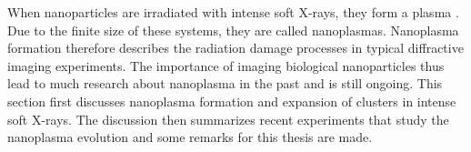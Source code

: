 %
When nanoparticles are irradiated with intense soft X-rays, they form a plasma \cite{Ditmire-1996-PRA}. Due to the finite size of these systems, they are called nanoplasmas. Nanoplasma formation therefore describes the radiation damage processes in typical diffractive imaging experiments. The importance of imaging biological nanoparticles thus lead to much research about nanoplasma in the past \cite{Ditmire-1996-PRA,Fennel-2010-RMP,Bostedt-2016-RMP,Bostedt-2012-PRL,Bostedt-2010-JPB,Mikaberidze-2008-PRA,Peltz-2014-PRL} and is still ongoing. This section first discusses nanoplasma formation and expansion of clusters in intense soft X-rays. The discussion then summarizes recent experiments that study the nanoplasma evolution and some remarks for this thesis are made.\\[1\baselineskip]
